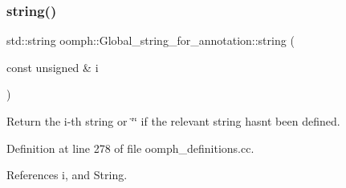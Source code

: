 \subsubsection{\texorpdfstring{string()}{string()}}
{\footnotesize\ttfamily std\+::string oomph\+::\+Global\+\_\+string\+\_\+for\+\_\+annotation\+::string (\begin{DoxyParamCaption}\item[{const unsigned \&}]{i }\end{DoxyParamCaption})}



Return the i-\/th string or \char`\"{}\char`\"{} if the relevant string hasn\textquotesingle{}t been defined. 



Definition at line 278 of file oomph\+\_\+definitions.\+cc.



References i, and String.



